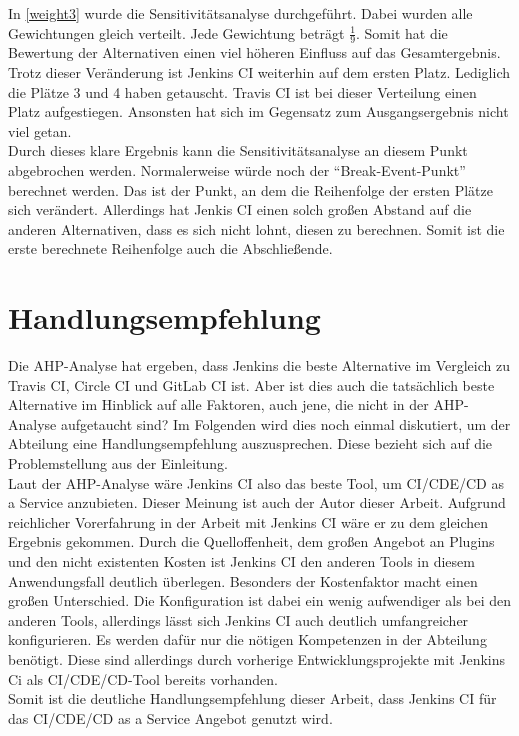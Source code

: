 In \ref{weight3} wurde die Sensitivitätsanalyse durchgeführt. Dabei wurden alle Gewichtungen gleich verteilt. Jede Gewichtung beträgt $\frac{1}{9}$. Somit hat die Bewertung der Alternativen einen viel höheren Einfluss auf das Gesamtergebnis. Trotz dieser Veränderung ist Jenkins CI weiterhin auf dem ersten Platz. Lediglich die Plätze 3 und 4 haben getauscht. Travis CI ist bei dieser Verteilung einen Platz aufgestiegen. Ansonsten hat sich im Gegensatz zum Ausgangsergebnis nicht viel getan.\\
Durch dieses klare Ergebnis kann die Sensitivitätsanalyse an diesem Punkt abgebrochen werden. Normalerweise würde noch der \enquote{Break-Event-Punkt} berechnet werden. Das ist der Punkt, an dem die Reihenfolge der ersten Plätze sich verändert. Allerdings hat Jenkis CI einen solch großen Abstand auf die anderen Alternativen, dass es sich nicht lohnt, diesen zu berechnen. Somit ist die erste berechnete Reihenfolge auch die Abschließende.
\section{Handlungsempfehlung}
Die AHP-Analyse hat ergeben, dass Jenkins die beste Alternative im Vergleich zu Travis CI, Circle CI und GitLab CI ist. Aber ist dies auch die tatsächlich beste Alternative im Hinblick auf alle Faktoren, auch jene, die nicht in der AHP-Analyse aufgetaucht sind? Im Folgenden wird dies noch einmal diskutiert, um der Abteilung eine Handlungsempfehlung auszusprechen. Diese bezieht sich auf die Problemstellung aus der Einleitung.\\
Laut der AHP-Analyse wäre Jenkins CI also das beste Tool, um \ac{CI}/\ac{CDE}/\ac{CD} as a Service anzubieten. Dieser Meinung ist auch der Autor dieser Arbeit. Aufgrund reichlicher Vorerfahrung in der Arbeit mit Jenkins CI wäre er zu dem gleichen Ergebnis gekommen. Durch die Quelloffenheit, dem großen Angebot an Plugins und den nicht existenten Kosten ist Jenkins CI den anderen Tools in diesem Anwendungsfall deutlich überlegen. Besonders der Kostenfaktor macht einen großen Unterschied. Die Konfiguration ist dabei ein wenig aufwendiger als bei den anderen Tools, allerdings lässt sich Jenkins CI auch deutlich umfangreicher konfigurieren. Es werden dafür nur die nötigen Kompetenzen in der Abteilung benötigt. Diese sind allerdings durch vorherige Entwicklungsprojekte mit Jenkins Ci als \ac{CI}/\ac{CDE}/\ac{CD}-Tool bereits vorhanden.\\
Somit ist die deutliche Handlungsempfehlung dieser Arbeit, dass Jenkins CI für das \ac{CI}/\ac{CDE}/\ac{CD} as a Service Angebot genutzt wird. 
